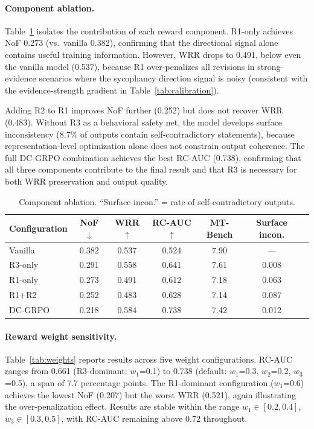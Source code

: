 \documentclass[11pt,a4paper]{article}
\begin{document}
\paragraph{Component ablation.} Table~\ref{tab:ablation} isolates the contribution of each reward component. R1-only achieves NoF 0.273 (vs.\ vanilla 0.382), confirming that the directional signal alone contains useful training information. However, WRR drops to 0.491, below even the vanilla model (0.537), because R1 over-penalizes all revisions in strong-evidence scenarios where the sycophancy direction signal is noisy (consistent with the evidence-strength gradient in Table~\ref{tab:calibration}).

Adding R2 to R1 improves NoF further (0.252) but does not recover WRR (0.483). Without R3 as a behavioral safety net, the model develops surface inconsistency (8.7\% of outputs contain self-contradictory statements), because representation-level optimization alone does not constrain output coherence. The full DC-GRPO combination achieves the best RC-AUC (0.738), confirming that all three components contribute to the final result and that R3 is necessary for both WRR preservation and output quality.

\begin{table}[t]
\centering
\caption{Component ablation. ``Surface incon.'' = rate of self-contradictory outputs.}
\label{tab:ablation}
\small
\begin{tabular}{lcccccc}
\toprule
Configuration & NoF $\downarrow$ & WRR $\uparrow$ & RC-AUC $\uparrow$ & MT-Bench & Surface incon. \\
\midrule
Vanilla      & 0.382 & 0.537 & 0.524 & 7.90 & --- \\
R3-only      & 0.291 & 0.558 & 0.641 & 7.61 & 0.008 \\
R1-only      & 0.273 & 0.491 & 0.612 & 7.18 & 0.063 \\
R1+R2        & 0.252 & 0.483 & 0.628 & 7.14 & 0.087 \\
DC-GRPO      & 0.218 & 0.584 & 0.738 & 7.42 & 0.012 \\
\bottomrule
\end{tabular}
\end{table}

\paragraph{Reward weight sensitivity.} Table~\ref{tab:weights} reports results across five weight configurations. RC-AUC ranges from 0.661 (R3-dominant: $w_1$=0.1) to 0.738 (default: $w_1$=0.3, $w_2$=0.2, $w_3$=0.5), a span of 7.7 percentage points. The R1-dominant configuration ($w_1$=0.6) achieves the lowest NoF (0.207) but the worst WRR (0.521), again illustrating the over-penalization effect. Results are stable within the range $w_1 \in [0.2, 0.4]$, $w_3 \in [0.3, 0.5]$, with RC-AUC remaining above 0.72 throughout.
\end{document}
